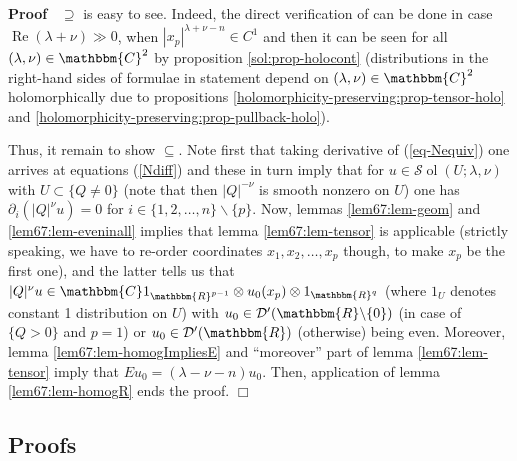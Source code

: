 \documentclass{article}
\newcommand{\tmop}[1]{\ensuremath{\operatorname{#1}}}
\newenvironment{proof}{\noindent\textbf{Proof\ }}{\hspace*{\fill}$\Box$\medskip}
\numberwithin{definition}{section}
\numberwithin{lemma}{section}
\numberwithin{proposition}{section}
{\theorembodyfont{\rmfamily}\newtheorem{remark}{Remark}
\numberwithin{remark}{section}
}
\begin{document}
\begin{proof}
  $\supseteq$ is easy to see. Indeed, the direct verification of can be done
  in case $\tmop{Re} ( \lambda + \nu) \gg 0$, when $| x_p |^{\lambda + \nu -
  n} \in C^1$ and then it can be seen for all $( \lambda, \nu) \in
  \mathbbm{C}^2$ by proposition \ref{sol:prop-holocont} (distributions in the
  right-hand sides of formulae in statement depend on $( \lambda, \nu) \in
  \mathbbm{C}^2$ holomorphically due to propositions
  \ref{holomorphicity-preserving:prop-tensor-holo} and
  \ref{holomorphicity-preserving:prop-pullback-holo}).
  
  Thus, it remain to show $\subseteq$. Note first that taking derivative of
  (\ref{eq-Nequiv}) one arrives at equations (\ref{Ndiff}) and these in turn
  imply that for $u \in \mathcal{S} \tmop{ol} ( U ; \lambda, \nu)$ with $U
  \subset \{ Q \neq 0 \}$ (note that then $| Q |^{- \nu}$ is smooth nonzero on
  $U$) one has $\partial_i ( | Q |^{\nu} u) = 0$ for $i \in \{ 1, 2, \ldots, n
  \} \backslash \{ p \}$. Now, lemmas \ref{lem67:lem-geom} and
  \ref{lem67:lem-eveninall} implies that lemma \ref{lem67:lem-tensor} is
  applicable (strictly speaking, we have to re-order coordinates $x_1, x_2,
  \ldots, x_p$ though, to make $x_p$ be the first one), and the latter tells
  us that $| Q |^{\nu} u \in \mathbbm{C}1_{\mathbbm{R}^{p - 1}} \otimes u_0 (
  x_p) \otimes 1_{\mathbbm{R}^q}$ (where $1_U$ denotes constant 1 distribution
  on $U$) with $u_0 \in \mathcal{D}' ( \mathbbm{R}\backslash \{ 0 \})$ (in
  case of $\{ Q > 0 \}$ and $p = 1$) or $u_0 \in \mathcal{D}' ( \mathbbm{R})$
  (otherwise) being even. Moreover, lemma \ref{lem67:lem-homogImpliesE} and
  ``moreover'' part of lemma \ref{lem67:lem-tensor} imply that $E u_0 = (
  \lambda - \nu - n) u_0$. Then, application of lemma \ref{lem67:lem-homogR}
  ends the proof.
\end{proof}

\subsection{Proofs}
\end{document}
